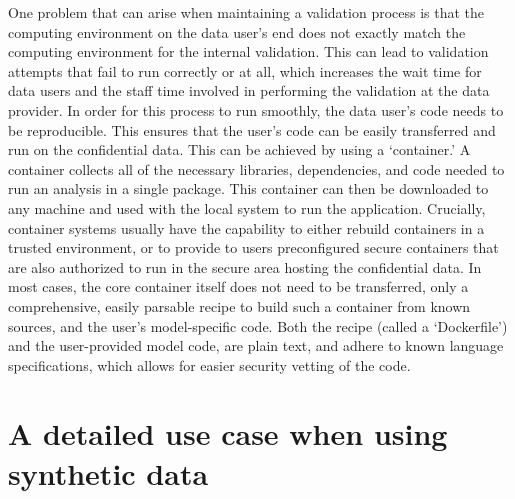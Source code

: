 \documentclass[inline]{hdsr}
\begin{document}
One problem that can arise when maintaining a validation process is that the 
computing environment on the data user's end does not exactly match the computing environment for
the internal validation. This can lead to validation attempts that fail to run correctly or at all, which
increases the wait time for data users and the staff time involved in performing the validation at the data provider. 
In order for this process to run smoothly, the data user's code needs to be reproducible.  This ensures that the user's code can be easily transferred and
run on the confidential data. This can be achieved by using a `container.' A container collects all of the
necessary libraries, dependencies, and code needed to run an analysis in a single
package. This container can then be downloaded to any machine and used with the local system to run
the application. Crucially, container systems usually have the capability to either rebuild containers in a trusted environment, or to provide to users preconfigured secure containers that are also authorized to run in the secure area hosting the confidential data. In most cases, the core container itself does not need to be transferred, only a comprehensive, easily parsable recipe to build such a container from known sources, and the user's model-specific code. Both the recipe (called a `Dockerfile') and the user-provided model code, are plain text, and adhere to known language specifications, which allows for easier security vetting of the code.

\section{A detailed use case when using synthetic data}
\label{sec:usecase}
\end{document}
